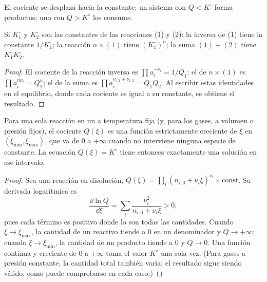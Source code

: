 \begin{omfigure}

{\small El cociente se desplaza hacia la constante: un sistema con $Q <
K^\circ$ forma productos; uno con $Q > K^\circ$ los consume.}
\end{omfigure}

\begin{proposition}\label{prop:b1:extent-q-and-k:combine-k}
Si $K_1^\circ$ y $K_2^\circ$ son las constantes de las reacciones (1) y
(2): la inversa de (1) tiene la constante $1/K_1^\circ$; la reacción
$n \times
(1)$ tiene $(K_1^\circ)^n$; la suma $(1) + (2)$ tiene $K_1^\circ K_2^\circ$.
\end{proposition}

\begin{proof}
El cociente de la reacción inversa es $\prod a_i^{-\nu_i} = 1/Q_1$; el de
$n \times (1)$ es $\prod a_i^{n\nu_i} = Q_1^n$; el de la suma es
$\prod a_i^{\nu_{i,1} + \nu_{i,2}} = Q_1 Q_2$. Al escribir estas
identidades en el equilibrio, donde cada cociente es igual a su
constante, se obtiene el resultado.
\end{proof}

\begin{proposition}\label{prop:b1:extent-q-and-k:q-monotone}
Para una sola reacción en un  a temperatura fija (y, para
los gases, a volumen o presión fijos), el cociente $Q(\xi)$ es una
función estrictamente creciente de $\xi$ en $(\xi_{\min}, \xi_{\max})$,
que va de 0 a $+\infty$ cuando no interviene ninguna especie de
 constante. La ecuación $Q(\xi) = K^\circ$ tiene entonces
exactamente una solución en ese intervalo.
\end{proposition}

\begin{proof}
Sea una reacción en disolución, $Q(\xi) = \prod_i (n_{i,0} + \nu_i\xi)^{\nu_i}
\times \text{const}$. Su derivada logarítmica es
\[
  \frac{\dd \ln Q}{\dd \xi} = \sum_i \frac{\nu_i^2}{n_{i,0} + \nu_i \xi}
  > 0 ,
\]
pues cada término es positivo donde lo son todas las cantidades. Cuando
$\xi \to \xi_{\max}$, la cantidad de un reactivo tiende a 0 en un
denominador y $Q \to +\infty$; cuando $\xi
\to \xi_{\min}$, la cantidad de un producto tiende a 0 y $Q \to 0$. Una
función continua y creciente de 0 a $+\infty$ toma el valor $K^\circ$
una sola vez. (Para gases a presión constante, la cantidad total también
varía; el resultado sigue siendo válido, como puede comprobarse en cada
caso.)
\end{proof}

